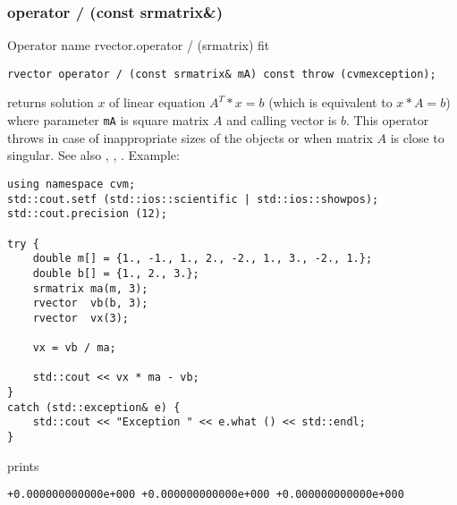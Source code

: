 \subsubsection{operator / (const srmatrix\&)}
Operator%
\pdfdest name {rvector.operator / (srmatrix)} fit
\begin{verbatim}
rvector operator / (const srmatrix& mA) const throw (cvmexception);
\end{verbatim}
returns solution $x$ of  linear equation
$A^T*x=b$ (which is equivalent to $x*A=b$) 
where parameter \verb"mA" is  square matrix $A$
and calling vector is $b$.
This operator throws 
in case of inappropriate sizes
of the objects or when  matrix $A$ is close to singular.
See also , , .
Example:
\begin{Verbatim}
using namespace cvm;
std::cout.setf (std::ios::scientific | std::ios::showpos);
std::cout.precision (12);

try {
    double m[] = {1., -1., 1., 2., -2., 1., 3., -2., 1.};
    double b[] = {1., 2., 3.};
    srmatrix ma(m, 3);
    rvector  vb(b, 3);
    rvector  vx(3);

    vx = vb / ma;

    std::cout << vx * ma - vb;
}
catch (std::exception& e) {
    std::cout << "Exception " << e.what () << std::endl;
}
\end{Verbatim}
prints
\begin{Verbatim}
+0.000000000000e+000 +0.000000000000e+000 +0.000000000000e+000
\end{Verbatim}
\newpage


